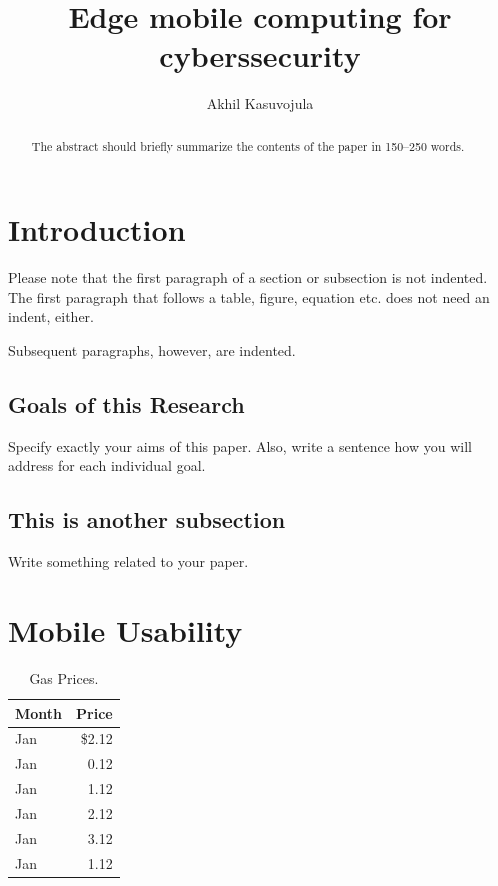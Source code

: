 \documentclass[runningheads]{llncs}
\begin{document}
%
\title{Edge mobile computing for cyberssecurity}
%
%
\author{Akhil Kasuvojula}
%
%
%
\maketitle              %
%
\begin{abstract}
The abstract should briefly summarize the contents of the paper in
150--250 words.

\end{abstract}
%
%
%
\section{Introduction}

Please note that the first paragraph of a section or subsection is
not indented. The first paragraph that follows a table, figure,
equation etc. does not need an indent, either.

Subsequent paragraphs, however, are indented.

\subsection{Goals of this Research} 
Specify exactly your aims of this paper. Also, write a sentence how you will address for each individual goal.

\subsection{This is another subsection}
Write something related to your paper.

\section{Mobile Usability}


\begin{table}
\caption{Gas Prices.}\label{gasprice}
\begin{tabular}{|l|r|}
\hline
Month &  Price \\
\hline
Jan &  \$2.12 \\
Jan &  0.12\\
Jan &  1.12\\
Jan &  2.12\\
Jan &  3.12\\
Jan &  1.12\\

\hline
\end{tabular}
\end{table}
\end{document}
